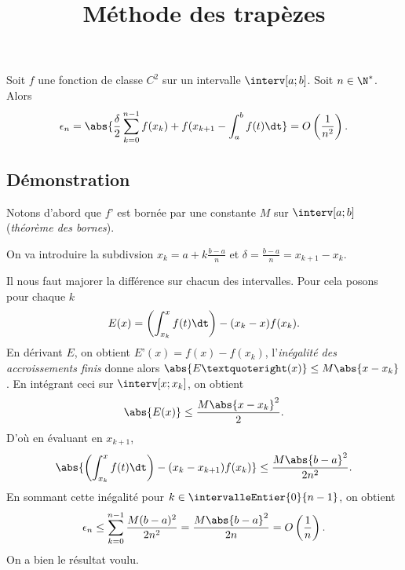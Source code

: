 \documentclass[fontsize=12pt,twoside=false,parskip=half, french]{scrartcl}
\title{Méthode des trapèzes}
\date{}
\author{}
\begin{document}
\maketitle
   \begin{Theoreme}
      Soit $f$ une fonction de classe $C^2$ sur un intervalle $\interv[a; b]$. Soit $n \in \N^*$. Alors
      \[
        \epsilon_n = \abs{\frac{\delta}{2} \sum_{k = 0}^{n - 1} f(x_k) + f(x_{k + 1} - \int_a^b f(t) \dt} = O\left(\frac{1}{n^2}\right).
      \]
   \end{Theoreme}
   \subsection{Démonstration}
      Notons d’abord que $f’$ est bornée par une constante $M$ sur $\interv[a; b]$ (\emph{théorème des bornes}).
      
      On va introduire la subdivsion $x_k = a + k \frac{b - a}{n}$ et $\delta = \frac{b - a}{n} = x_{k + 1} - x_k$.

      Il nous faut majorer la différence sur chacun des intervalles. Pour cela posons pour chaque $k$
      \[
         E(x) = \left(\int_{x_k}^{x} f(t) \dt \right) - (x_k - x) f(x_k).
      \]
      En dérivant $E$, on obtient $E’(x) = f(x) - f(x_k)$, l’\emph{inégalité des accroissements finis} donne alors
      $\abs{E’(x)} \leq M\abs{x - x_k}$. En intégrant ceci sur $\interv[x; x_k]$, on obtient
      \[
         \abs{E(x)} \leq \frac{M\abs{x - x_k}^2}{2}.
      \]
      D’où en évaluant en $x_{k + 1}$,
      \[
         \abs{\left(\int_{x_k}^{x} f(t) \dt \right) - (x_k - x_{k + 1}) f(x_k)} \leq \frac{M\abs{b - a}^2}{2n^2}.
      \]
      En sommant cette inégalité pour $k \in \intervalleEntier{0}{n - 1}$, on obtient
      \[
         \epsilon_n  \leq \sum_{k = 0}^{n - 1} \frac{M(b - a)^2}{2n^2} = \frac{M\abs{b - a}^2}{2n} = O\left(\frac{1}{n}\right).
      \]
      On a bien le résultat voulu.
\end{document}
